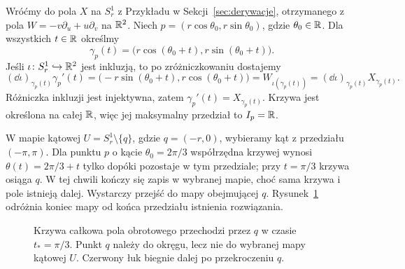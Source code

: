 \begin{przyklad}
Wróćmy do pola $X$ na $S_r^1$ z Przykładu w
Sekcji~\ref{sec:derywacje}, otrzymanego z pola
$W=-v\partial_u+u\partial_v$ na $\mathbb{R}^2$.
Niech $p=(r\cos\theta_0,r\sin\theta_0)$, gdzie $\theta_0\in\mathbb{R}$.
Dla wszystkich $t\in\mathbb{R}$ określmy
\[
\gamma_p(t)=\bigl(r\cos(\theta_0+t),
                    r\sin(\theta_0+t)\bigr).
\]
Jeśli $\iota\colon S_r^1\hookrightarrow\mathbb{R}^2$ jest inkluzją,
to po zróżniczkowaniu dostajemy
\[
(\dd\iota)_{\gamma_p(t)}\gamma_p'(t)
=\bigl(-r\sin(\theta_0+t),r\cos(\theta_0+t)\bigr)
=W_{\iota(\gamma_p(t))}
=(\dd\iota)_{\gamma_p(t)}X_{\gamma_p(t)}.
\]
Różniczka inkluzji jest injektywna, zatem
$\gamma_p'(t)=X_{\gamma_p(t)}$.
Krzywa jest określona na całej $\mathbb{R}$, więc jej maksymalny
przedział to $I_p=\mathbb{R}$.

W mapie kątowej $U=S_r^1\setminus\{q\}$, gdzie $q=(-r,0)$,
wybieramy kąt z przedziału $(-\pi,\pi)$. Dla punktu
$p$ o kącie $\theta_0=2\pi/3$ współrzędna krzywej wynosi
$\theta(t)=2\pi/3+t$ tylko dopóki pozostaje w tym przedziale;
przy $t=\pi/3$ krzywa osiąga $q$. W tej chwili kończy się zapis
w wybranej mapie, choć sama krzywa i pole istnieją dalej.
Wystarczy przejść do mapy obejmującej $q$.
Rysunek~\ref{fig:krzywa-przez-granice-mapy} odróżnia koniec mapy
od końca przedziału istnienia rozwiązania.
\end{przyklad}

\begin{figure}[!htbp]
\centering
{}
\caption{Krzywa całkowa pola obrotowego przechodzi przez $q$ w czasie
$t_*=\pi/3$. Punkt $q$ należy do okręgu, lecz nie do wybranej mapy
kątowej $U$. Czerwony łuk biegnie dalej po przekroczeniu $q$.}
\label{fig:krzywa-przez-granice-mapy}
\end{figure}

